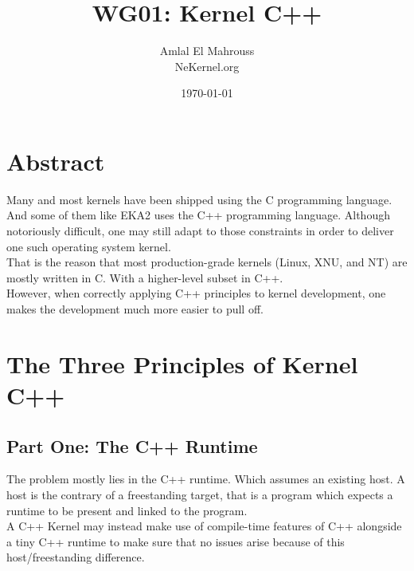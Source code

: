 \documentclass[11pt, a4paper]{article}
\title{WG01: Kernel C++}
\author{Amlal El Mahrouss\\NeKernel.org}
\date{\today}
\begin{document}
\maketitle

\section{Abstract}
{
Many and most kernels have been shipped using the C programming language.\\
And some of them like EKA2 uses the C++ programming language. Although notoriously difficult, one may still adapt to those constraints in order to deliver one such operating system kernel. \\
That is the reason that most production-grade kernels (Linux, XNU, and NT) are mostly written in C. With a higher-level subset in C++. \\
However, when correctly applying C++ principles to kernel development, one makes the development much more easier to pull off.
}

\section{The Three Principles of Kernel C++}
\subsection{Part One: The C++ Runtime}
{
The problem mostly lies in the C++ runtime. Which assumes an existing host. A host is the contrary of a freestanding target, that is a program which expects a runtime to be present and linked to the program. \\
A C++ Kernel may instead make use of compile-time features of C++ alongside a tiny C++ runtime to make sure that no issues arise because of this host/freestanding difference.
}
\end{document}
